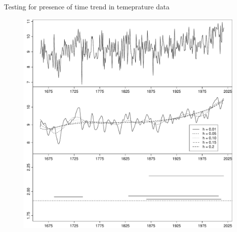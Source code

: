 \documentclass[10pt, handout]{beamer}
\begin{document}
\begin{frame}{Testing for presence of time trend in temeprature data}
  \begin{figure}
    \centering
    \includegraphics[height=0.85\textheight]{threegraphics_testing_constant_method_ll.pdf}
    \label{figure:shape_results}
  \end{figure}
\end{frame}
\end{document}
